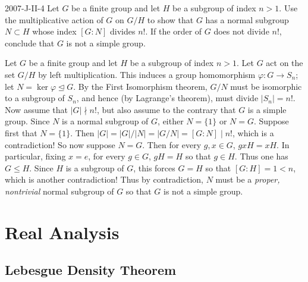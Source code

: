 \documentclass{article}
\begin{document}
	\begin{prb}{2007-J-II-4}
		Let $G$ be a finite group and let $H$ be a subgroup of index $n > 1$. Use the multiplicative action of $G$ on $G/H$ to show that $G$ has a normal subgroup $N \subset H$ whose index $[G:N]$ divides $n!$. If the order of $G$ does not divide $n!$, conclude that $G$ is not a simple group. 
	\end{prb}
	Let $G$ be a finite group and let $H$ be a subgroup of index $n > 1$. Let $G$ act on the set $G/H$ by left multiplication. This induces a group homomorphism $\varphi: G \to S_{n}$; let $N = \ker{\varphi}\trianglelefteq G$. By the First Isomorphism theorem, $G/N$ must be isomorphic to a subgroup of $S_{n}$, and hence (by Lagrange's theorem), must divide $|S_{n}| = n!$. Now assume that $|G| \nmid n!$, but also assume to the contrary that $G$ is a simple group. Since $N$ is a normal subgroup of $G$, either $N = \{1\}$ or $N = G$. Suppose first that $N = \{1\}$. Then $|G| = |G|/|N| = |G/N| = [G:N] \mid n!$, which is a contradiction! So now suppose $N = G$. Then for every $g, x \in G$, $gxH = xH$. In particular, fixing $x = e$, for every $g \in G$, $gH = H$ so that $g \in H$. Thus one has $G \leq H$. Since $H$ is a subgroup of $G$, this forces $G = H$ so that $[G:H] = 1 < n$, which is another contradiction! Thus by contradiction, $N$ must be a \textit{proper, nontrivial} normal subgroup of $G$ so that $G$ is not a simple group. 
	
	\newpage 
	\section{Real Analysis}
	
	\subsection{Lebesgue Density Theorem}
	
\end{document}
